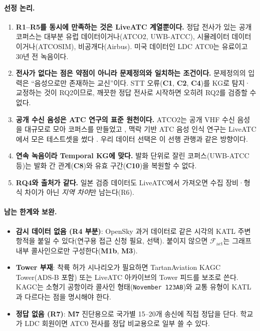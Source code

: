 \documentclass[10pt,a4paper]{article}
\newcommand{\ch}[1]{\textbf{\textcolor{red!60!black}{#1}}}
\newcommand{\md}[1]{\textbf{\textcolor{blue!60!black}{#1}}}
\begin{document}
\paragraph{선정 논리.}
\begin{enumerate}
\item \textbf{R1--R5를 동시에 만족하는 것은 LiveATC 계열뿐이다.} 정답 전사가 있는 공개 코퍼스는 대부분 유럽 데이터이거나(ATCO2, UWB-ATCC), 시뮬레이터 데이터이거나(ATCOSIM), 비공개다(Airbus). 미국 데이터인 LDC ATC0는 유료이고 30년 전 녹음이다.
\item \textbf{전사가 없다는 점은 약점이 아니라 문제정의와 일치하는 조건이다.} 문제정의의 입력은 ``음성으로만 존재하는 교신''이다. STT 오류(\ch{C1}, \ch{C2}, \ch{C4})를 KG로 탐지·교정하는 것이 RQ2이므로, 깨끗한 정답 전사로 시작하면 오히려 RQ2를 검증할 수 없다.
\item \textbf{공개 수신 음성은 ATC 연구의 표준 원천이다.} ATCO2는 공개 VHF 수신 음성을 대규모로 모아 코퍼스를 만들었고 \cite{atco2}, 맥락 기반 ATC 음성 인식 연구는 LiveATC에서 모은 테스트셋을 썼다 \cite{zuluaga2021}. 우리 데이터 선택은 이 선행 관행과 같은 방향이다.
\item \textbf{연속 녹음이라 Temporal KG에 맞다.} 발화 단위로 잘린 코퍼스(UWB-ATCC 등)는 발화 간 관계(\ch{C8})와 유효 구간(\ch{C10})을 복원할 수 없다.
\item \textbf{RQ4와 출처가 같다.} 일본 검증 데이터도 LiveATC에서 가져오면 수집 장비·형식 차이가 아닌 \emph{지역 차이}만 남는다(R6).
\end{enumerate}

\paragraph{남는 한계와 보완.}
\begin{itemize}
\item \textbf{감시 데이터 없음 (R4 부분)}: OpenSky 과거 데이터로 같은 시각의 KATL 주변 항적을 붙일 수 있다(연구용 접근 신청 필요, 선택). 붙이지 않으면 $\mathcal{F}_{\mathrm{act}}$는 그래프 내부 콜사인으로만 구성한다(\md{M1b}, \md{M3}).
\item \textbf{Tower 부재}: 착륙 허가 시나리오가 필요하면 TartanAviation KAGC Tower(ADS-B 포함) 또는 LiveATC 아카이브의 Tower 피드를 보조로 쓴다. KAGC는 소형기 공항이라 콜사인 형태(\texttt{November 123AB})와 교통 유형이 KATL과 다르다는 점을 명시해야 한다.
\item \textbf{정답 없음 (R7)}: \md{M7} 진단용으로 국가별 15--20개 송신에 직접 정답을 단다. 학교가 LDC 회원이면 ATC0 전사를 정답 비교용으로 일부 쓸 수 있다.
\end{itemize}
\end{document}
